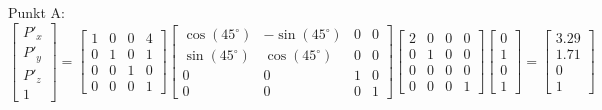 \documentclass[11pt, a4paper]{article} %
\begin{document}
Punkt A: $\begin{bmatrix}
	P'_x \\ P'_y \\ P'_z \\ 1
\end{bmatrix} = \begin{bmatrix}
	1 & 0 & 0 & 4 \\ 0 & 1 & 0 & 1 \\ 0 & 0 & 1 & 0 \\ 0 & 0 & 0 & 1
\end{bmatrix} \begin{bmatrix}
	\cos(45^\circ) & -\sin(45^\circ) & 0 & 0 \\ \sin(45^\circ) & \cos(45^\circ) & 0 & 0 \\ 0 & 0 & 1 & 0 \\ 0 & 0 & 0 & 1
\end{bmatrix} \begin{bmatrix}
	2 & 0 & 0 & 0 \\ 0 & 1 & 0 & 0 \\ 0 & 0 & 0 & 0 \\ 0 & 0 & 0 & 1
\end{bmatrix} \begin{bmatrix}
	0 \\ 1 \\ 0 \\ 1
\end{bmatrix} = \begin{bmatrix}
3.29 \\ 1.71 \\ 0 \\ 1
\end{bmatrix}$ \\
\end{document}
